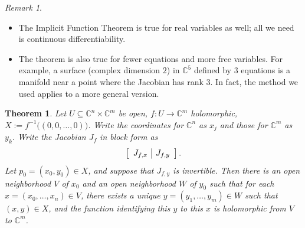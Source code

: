 \documentclass[12pt]{article}
\newcommand{\cx}{\mathbb{C}}
\newcommand\inv[1]{#1^{-1}}
\newtheorem{theorem}{Theorem}[section]
\theoremstyle{definition}
\theoremstyle{remark}
\newtheorem*{remark}{Remark}
\begin{document}
\begin{remark}
    \noindent
    \begin{itemize}
        \item The Implicit Function Theorem is true for real variables as well; all we need is continuous differentiability.
        \item The theorem is also true for fewer equations and more free variables. For example, a surface (complex dimension $2$) in $\cx^5$ defined by 3 equations is a manifold near a point where the Jacobian has rank 3. In fact, the method we used applies to a more general version.
    \end{itemize}
\end{remark}
\begin{theorem}
    Let $U \subseteq \cx^n \times \cx^m$ be open, $f : U \to \cx^m$ holomorphic, $X := \inv{f} \big( (0,0,\dotsc,0) \big)$. Write the coordinates for $\cx^n$ as $x_j$ and those for $\cx^m$ as $y_k$. Write the Jacobian $J_f$ in block form as 
    \[
        \left[ 
            \begin{array}{c | c}
                J_{f,x} & J_{f,y}  
            \end{array}
        \right].
    \]
    Let $p_0 = (x_0,y_0) \in X$, and suppose that $J_{f,y}$ is invertible. Then there is an open neighborhood $V$ of $x_0$ and an open neighborhood $W$ of $y_0$ such that for each $x = (x_0 , \dotsc , x_n) \in V$, there exists a unique $y = (y_1 , \dotsc , y_m) \in W$ such that $(x,y) \in X$, and the function identifying this $y$ to this $x$ is holomorphic from $V$ to $\cx^m$.
\end{theorem}
\end{document}

